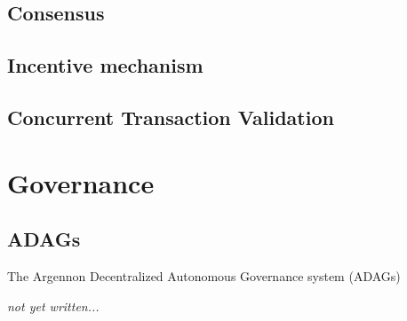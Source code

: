 \documentclass[11pt, a4paper]{report}
\newcommand{\note}[1] {
    \begin{tcolorbox}[colframe=white,colback=white]
        \emph{#1}
    \end{tcolorbox}
}
\begin{document}
    \section{Consensus}\label{sec:consensus}
    


    \section{Incentive mechanism}\label{sec:incentive-mechanism}
    


    \section{Concurrent Transaction Validation}\label{sec:concurrency}
    


    \chapter{Governance}\label{ch:governance}
    \section{ADAGs}\label{sec:adags}
    The Argennon Decentralized Autonomous Governance system (ADAGs)
    \note{not yet written...}
\end{document}
